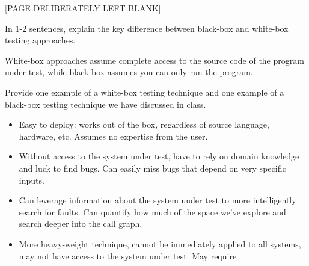 \documentclass[addpoints]{exam}
\begin{document}
\begin{questions}

\newpage
\begin{center}
  [PAGE DELIBERATELY LEFT BLANK]
\end{center}
\newpage

\question[4] In 1-2 sentences, explain the key difference between
  black-box and white-box testing approaches. %

  \begin{solution}
    White-box approaches assume complete access to the source code of
    the program under test, while black-box assumes you can only run
    the program.
  	\end{solution}

\question[2] Provide one example of a white-box testing technique and
  one example of a black-box testing technique we have discussed in
  class. %

  \begin{solution}
    \begin{itemize}
    \item[BB Pros:] Easy to deploy: works out of the box, regardless
      of source language, hardware, etc. Assumes no expertise from the
      user.
    \item[BB Con:] Without access to the system under test, have to
      rely on domain knowledge and luck to find bugs. Can easily miss
      bugs that depend on very specific inputs.
    \item[WB Pro:] Can leverage information about the system under
      test to more intelligently search for faults. Can quantify how
      much of the space we've explore and search deeper into the call
      graph.
    \item[WB Cons:] More heavy-weight technique, cannot be immediately
      applied to all systems, may not have access to the system under
      test. May require
    \end{itemize}
  	\end{solution}


\end{questions}
\end{document}
